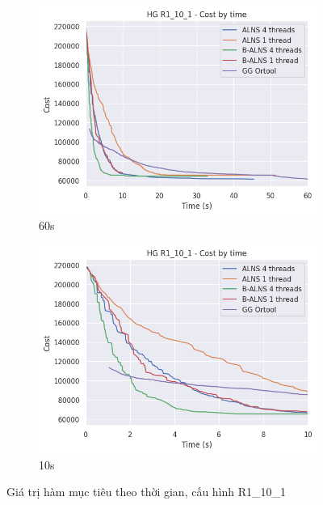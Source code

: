 \begin{figure}[H] %
  \label{fig:perf_ct_r1_10}
  \begin{subfigure}{.5\textwidth}
    \centering
    \includegraphics[width=1\linewidth]{figures/cost_time_60s_R1_10_1.png}
    \caption{60s}
    \label{fig:perf_ct_r1_10_60s}
  \end{subfigure}%
  \begin{subfigure}{.5\textwidth}
    \centering
    \includegraphics[width=1\linewidth]{figures/cost_time_10s_R1_10_1.png}
    \caption{10s}
    \label{fig:perf_ct_r1_10_10s}
  \end{subfigure}
  \caption{Giá trị hàm mục tiêu theo thời gian, cấu hình R1\_10\_1}
\end{figure}

